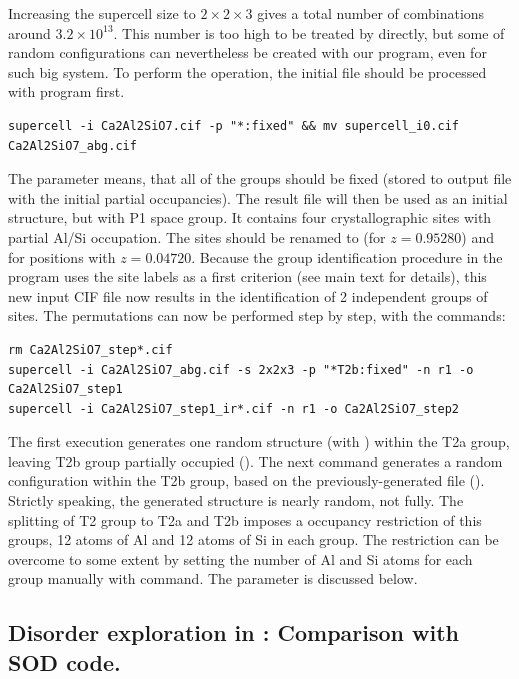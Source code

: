 \documentclass[a4paper,10pt]{article}
\begin{document}
Increasing the supercell size to $2\times2\times3$ gives a total number of combinations around $3.2 \times 10^{13}$. This number is too high to be treated by \sups{} directly, but some of random configurations can nevertheless be created with our program, even for such big system. To perform the operation, the initial file should be processed with \sups{} program first.
\begin{Verbatim}[breaklines]
supercell -i Ca2Al2SiO7.cif -p "*:fixed" && mv supercell_i0.cif Ca2Al2SiO7_abg.cif
\end{Verbatim}
The parameter  means, that all of the groups should be fixed (stored to output file with the initial partial occupancies). The result file  will then be used as an initial structure, but with P1 space group. It contains four crystallographic sites with partial Al/Si occupation. The sites  should be renamed to  (for $z=0.95280$) and  for positions with $z=0.04720$. Because the group identification procedure in the \sups{} program uses the site labels as a first criterion (see main text for details), this new input CIF file now results in the identification of 2 independent groups of sites. The permutations can now be performed step by step, with the commands:
\begin{Verbatim}[breaklines]
rm Ca2Al2SiO7_step*.cif
supercell -i Ca2Al2SiO7_abg.cif -s 2x2x3 -p "*T2b:fixed" -n r1 -o Ca2Al2SiO7_step1 
supercell -i Ca2Al2SiO7_step1_ir*.cif -n r1 -o Ca2Al2SiO7_step2
\end{Verbatim}
The first \sups{} execution generates one random structure (with ) within the T2a group, leaving T2b group partially occupied (). The next command generates a random configuration within the T2b group, based on the previously-generated file (). Strictly speaking, the generated structure is nearly random, not fully. The splitting of T2 group to T2a and T2b imposes a occupancy restriction of this groups, 12 atoms of Al and 12 atoms of Si in each group. The restriction can be overcome to some extent by setting the number of Al and Si atoms for each group manually with  command. The parameter is discussed below.

\subsection*{Disorder exploration in : Comparison with SOD code.}
\end{document}
